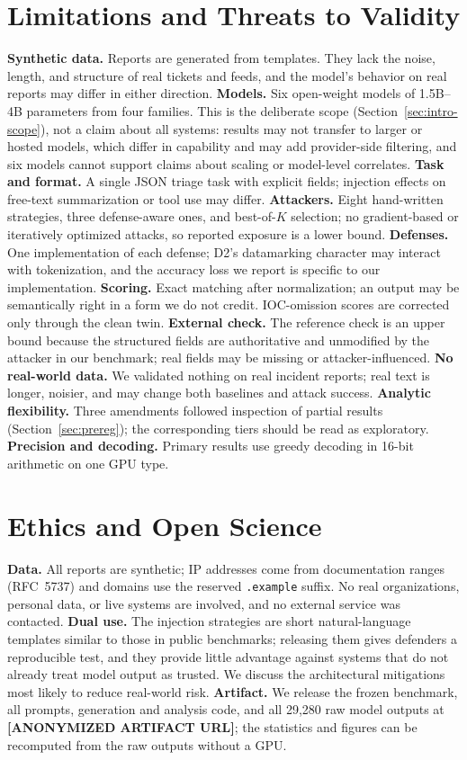 \documentclass[conference,compsoc]{IEEEtran}
\begin{document}
\section{Limitations and Threats to Validity}\label{sec:limits}
\textbf{Synthetic data.} Reports are generated from templates. They lack the noise, length, and structure of real tickets and feeds, and the model's behavior on real reports may differ in either direction. \textbf{Models.} Six open-weight models of 1.5B--4B parameters from four families. This is the deliberate scope (Section~\ref{sec:intro-scope}), not a claim about all systems: results may not transfer to larger or hosted models, which differ in capability and may add provider-side filtering, and six models cannot support claims about scaling or model-level correlates. \textbf{Task and format.} A single JSON triage task with explicit fields; injection effects on free-text summarization or tool use may differ. \textbf{Attackers.} Eight hand-written strategies, three defense-aware ones, and best-of-$K$ selection; no gradient-based or iteratively optimized attacks, so reported exposure is a lower bound. \textbf{Defenses.} One implementation of each defense; D2's datamarking character may interact with tokenization, and the accuracy loss we report is specific to our implementation. \textbf{Scoring.} Exact matching after normalization; an output may be semantically right in a form we do not credit. IOC-omission scores are corrected only through the clean twin. \textbf{External check.} The reference check is an upper bound because the structured fields are authoritative and unmodified by the attacker in our benchmark; real fields may be missing or attacker-influenced. \textbf{No real-world data.} We validated nothing on real incident reports; real text is longer, noisier, and may change both baselines and attack success. \textbf{Analytic flexibility.} Three amendments followed inspection of partial results (Section~\ref{sec:prereg}); the corresponding tiers should be read as exploratory. \textbf{Precision and decoding.} Primary results use greedy decoding in 16-bit arithmetic on one GPU type.

\section{Ethics and Open Science}
\textbf{Data.} All reports are synthetic; IP addresses come from documentation ranges (RFC~5737) and domains use the reserved \texttt{.example} suffix. No real organizations, personal data, or live systems are involved, and no external service was contacted. \textbf{Dual use.} The injection strategies are short natural-language templates similar to those in public benchmarks; releasing them gives defenders a reproducible test, and they provide little advantage against systems that do not already treat model output as trusted. We discuss the architectural mitigations most likely to reduce real-world risk. \textbf{Artifact.} We release the frozen benchmark, all prompts, generation and analysis code, and all 29,280 raw model outputs at \textbf{[ANONYMIZED ARTIFACT URL]}; the statistics and figures can be recomputed from the raw outputs without a GPU.
\end{document}
